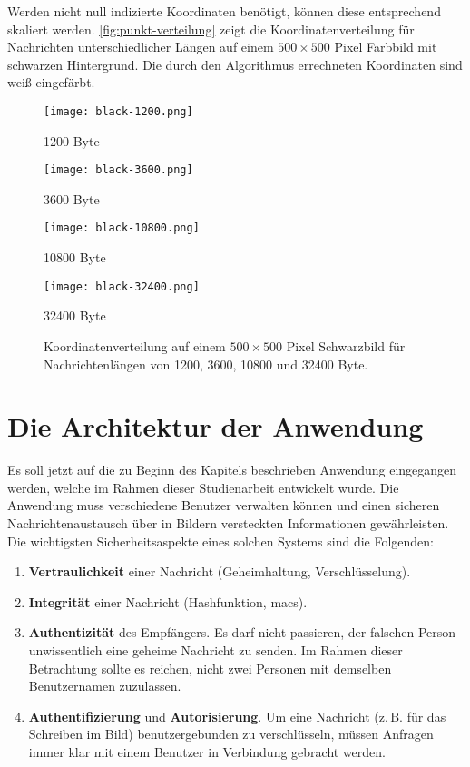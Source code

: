 \noindent
Werden nicht null indizierte Koordinaten benötigt, können diese entsprechend skaliert werden.
\autoref{fig:punkt-verteilung} zeigt die Koordinatenverteilung für Nachrichten unterschiedlicher
Längen auf einem $500 \times 500$ Pixel Farbbild mit schwarzen Hintergrund. Die durch den Algorithmus
errechneten Koordinaten sind weiß eingefärbt.
\begin{figure}
  \centering
  \begin{minipage}[t]{0.45\textwidth}
    \texttt{[image: black-1200.png]}
    \caption*{1200 Byte}
  \end{minipage}
  \hfill
  \begin{minipage}[t]{0.45\textwidth}
    \texttt{[image: black-3600.png]}
    \caption*{3600 Byte}
  \end{minipage}%
  \vspace{0.5cm}
  \begin{minipage}[t]{0.45\textwidth}
    \texttt{[image: black-10800.png]}
    \caption*{10800 Byte}
  \end{minipage}
  \hfill
  \begin{minipage}[t]{0.45\textwidth}
    \texttt{[image: black-32400.png]}
    \caption*{32400 Byte}
  \end{minipage}
  \caption{Koordinatenverteilung auf einem $500 \times 500$ Pixel Schwarzbild für Nachrichtenlängen von 1200, 3600, 10800 und 32400 Byte.}
  \label{fig:punkt-verteilung}
\end{figure}

\newpage
\section{Die Architektur der Anwendung}
Es soll jetzt auf die zu Beginn des Kapitels beschrieben Anwendung
eingegangen werden, welche im Rahmen dieser Studienarbeit entwickelt wurde.
Die Anwendung muss verschiedene Benutzer verwalten können und
einen sicheren Nachrichtenaustausch über in Bildern
versteckten Informationen gewährleisten.
Die wichtigsten Sicherheitsaspekte eines
solchen Systems sind die Folgenden:
\begin{enumerate}
  \item \textbf{Vertraulichkeit} einer Nachricht (Geheimhaltung, Verschlüsselung).
  \item \textbf{Integrität} einer Nachricht (Hashfunktion, \acp{mac}).
  \item \textbf{Authentizität} des Empfängers. Es darf nicht passieren, der falschen Person
        unwissentlich eine geheime Nachricht zu senden. Im Rahmen dieser Betrachtung sollte
        es reichen, nicht zwei Personen mit demselben Benutzernamen zuzulassen.
  \item \textbf{Authentifizierung} und \textbf{Autorisierung}. Um eine Nachricht
        (z.\,B. für das Schreiben im Bild) benutzergebunden zu verschlüsseln,
        müssen Anfragen immer klar mit einem Benutzer in Verbindung gebracht werden.
\end{enumerate}

